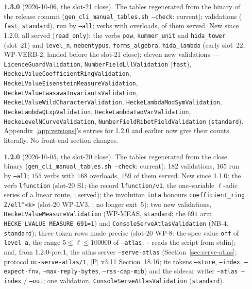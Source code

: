 \documentclass[11pt,openany]{report}
\newcommand{\Ecite}[1]{{\ttfamily[E,~#1]}}
\newcommand{\cli}[1]{\texttt{#1}}
\newcommand{\vb}[1]{\texttt{#1}}
\begin{document}
\textbf{1.3.0} (2026-10-06, the slot-21 close). The tables regenerated from the binary of the release commit
(\texttt{gen\_cli\_manual\_tables.sh --check}: current); \CMNumValidations{} validations (\CMNumFast{} \texttt{fast},
\CMNumStandard{} \texttt{standard}), \CMNumAll{} run by \cli{--all}; \CMNumVerbs{} verbs with \CMNumOverloads{} overloads,
\CMNumReadOnly{} of them served. New since 1.2.0, all served (\texttt{read\_only}): the verbs \vb{pow}, \vb{kummer\_unit} and
\vb{hida\_tower} (slot~21) and \vb{level\_n}, \vb{nebentypus}, \vb{forms\_algebra}, \vb{hida\_lambda} (early slot~22, WP-VERB-2,
landed before the slot-21 close); eleven new validations --- \vb{LicenceGuardValidation}, \vb{NumberFieldLllValidation}
(\texttt{fast}), \vb{HeckeLValueCoefficientRingValidation}, \vb{HeckeLValueEisensteinMeasureValidation},
\vb{HeckeLValueIwasawaInvariantsValidation}, \vb{HeckeLValueWildCharacterValidation}, \vb{HeckeLambdaModSymValidation},
\vb{HeckeLambdaQExpValidation}, \vb{HeckeLambdaTwoVarValidation}, \vb{HeckeLevelNCurveValidation},
\vb{NumberFieldRibetFieldValidation} (\texttt{standard}). Appendix~\ref{app:versions}'s entries for 1.2.0 and earlier now give their
counts literally. No front-end section changes.

\textbf{1.2.0} (2026-10-05, the slot-20 close). The tables regenerated from the close binary
(\texttt{gen\_cli\_manual\_tables.sh --check}: current); $182$ validations, $165$ run by
\cli{--all}; $155$ verbs with $168$ overloads, $159$ of them served. New since 1.1.0:
the verb \vb{lfunction} (slot-20 S1; the record \texttt{lfunction/v1}, the one-variable $\ell$-adic series of
a linear route, \Ecite{sec:lvlfunction}; served); the involution \vb{iota} honours
\vb{coefficient\_ring} \vb{Z/ell\^{}<k>} (slot-20 WP-LV3, \Ecite{sec:ring}; no longer exit~5); two new
validations, \vb{HeckeLValueMeasureValidation} (WP-MEAS, \texttt{standard}; the $691$ arm
\texttt{HECKE\_LVALUE\_MEASURE\_691=1}) and \vb{ConsoleServeAtlasValidation} (NB-4, \texttt{standard});
three token rows made precise (slot-20 WP-8: the spec value \texttt{off} of \texttt{level\_a}, the range
$5\le\ell\le100000$ of \cli{--atlas}, \cli{-} reads the script from stdin); and, from 1.2.0-pre.1, the atlas server
\cli{--serve-atlas} (Section~\ref{sec:serve-atlas}; protocol \texttt{oc-serve-atlas/1}, [P] v3.11
Section~18.16; its tokens \cli{--store}, \cli{--index}, \cli{--expect-fnv}, \cli{--max-reply-bytes},
\cli{--rss-cap-mib}) and the sidecar writer \cli{--atlas --index} / \cli{--out}; one validation,
\vb{ConsoleServeAtlasValidation} (\texttt{standard}).
\end{document}
